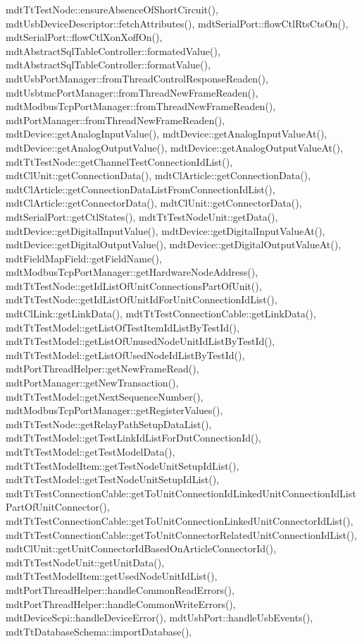mdt\-Tt\-Test\-Node\-::ensure\-Absence\-Of\-Short\-Circuit(), mdt\-Usb\-Device\-Descriptor\-::fetch\-Attributes(), mdt\-Serial\-Port\-::flow\-Ctl\-Rts\-Cts\-On(), mdt\-Serial\-Port\-::flow\-Ctl\-Xon\-Xoff\-On(), mdt\-Abstract\-Sql\-Table\-Controller\-::formated\-Value(), mdt\-Abstract\-Sql\-Table\-Controller\-::format\-Value(), mdt\-Usb\-Port\-Manager\-::from\-Thread\-Control\-Response\-Readen(), mdt\-Usbtmc\-Port\-Manager\-::from\-Thread\-New\-Frame\-Readen(), mdt\-Modbus\-Tcp\-Port\-Manager\-::from\-Thread\-New\-Frame\-Readen(), mdt\-Port\-Manager\-::from\-Thread\-New\-Frame\-Readen(), mdt\-Device\-::get\-Analog\-Input\-Value(), mdt\-Device\-::get\-Analog\-Input\-Value\-At(), mdt\-Device\-::get\-Analog\-Output\-Value(), mdt\-Device\-::get\-Analog\-Output\-Value\-At(), mdt\-Tt\-Test\-Node\-::get\-Channel\-Test\-Connection\-Id\-List(), mdt\-Cl\-Unit\-::get\-Connection\-Data(), mdt\-Cl\-Article\-::get\-Connection\-Data(), mdt\-Cl\-Article\-::get\-Connection\-Data\-List\-From\-Connection\-Id\-List(), mdt\-Cl\-Article\-::get\-Connector\-Data(), mdt\-Cl\-Unit\-::get\-Connector\-Data(), mdt\-Serial\-Port\-::get\-Ctl\-States(), mdt\-Tt\-Test\-Node\-Unit\-::get\-Data(), mdt\-Device\-::get\-Digital\-Input\-Value(), mdt\-Device\-::get\-Digital\-Input\-Value\-At(), mdt\-Device\-::get\-Digital\-Output\-Value(), mdt\-Device\-::get\-Digital\-Output\-Value\-At(), mdt\-Field\-Map\-Field\-::get\-Field\-Name(), mdt\-Modbus\-Tcp\-Port\-Manager\-::get\-Hardware\-Node\-Address(), mdt\-Tt\-Test\-Node\-::get\-Id\-List\-Of\-Unit\-Connections\-Part\-Of\-Unit(), mdt\-Tt\-Test\-Node\-::get\-Id\-List\-Of\-Unit\-Id\-For\-Unit\-Connection\-Id\-List(), mdt\-Cl\-Link\-::get\-Link\-Data(), mdt\-Tt\-Test\-Connection\-Cable\-::get\-Link\-Data(), mdt\-Tt\-Test\-Model\-::get\-List\-Of\-Test\-Item\-Id\-List\-By\-Test\-Id(), mdt\-Tt\-Test\-Model\-::get\-List\-Of\-Unused\-Node\-Unit\-Id\-List\-By\-Test\-Id(), mdt\-Tt\-Test\-Model\-::get\-List\-Of\-Used\-Node\-Id\-List\-By\-Test\-Id(), mdt\-Port\-Thread\-Helper\-::get\-New\-Frame\-Read(), mdt\-Port\-Manager\-::get\-New\-Transaction(), mdt\-Tt\-Test\-Model\-::get\-Next\-Sequence\-Number(), mdt\-Modbus\-Tcp\-Port\-Manager\-::get\-Register\-Values(), mdt\-Tt\-Test\-Node\-::get\-Relay\-Path\-Setup\-Data\-List(), mdt\-Tt\-Test\-Model\-::get\-Test\-Link\-Id\-List\-For\-Dut\-Connection\-Id(), mdt\-Tt\-Test\-Model\-::get\-Test\-Model\-Data(), mdt\-Tt\-Test\-Model\-Item\-::get\-Test\-Node\-Unit\-Setup\-Id\-List(), mdt\-Tt\-Test\-Model\-::get\-Test\-Node\-Unit\-Setup\-Id\-List(), mdt\-Tt\-Test\-Connection\-Cable\-::get\-To\-Unit\-Connection\-Id\-Linked\-Unit\-Connection\-Id\-List\-Part\-Of\-Unit\-Connector(), mdt\-Tt\-Test\-Connection\-Cable\-::get\-To\-Unit\-Connection\-Linked\-Unit\-Connector\-Id\-List(), mdt\-Tt\-Test\-Connection\-Cable\-::get\-To\-Unit\-Connector\-Related\-Unit\-Connection\-Id\-List(), mdt\-Cl\-Unit\-::get\-Unit\-Connector\-Id\-Based\-On\-Article\-Connector\-Id(), mdt\-Tt\-Test\-Node\-Unit\-::get\-Unit\-Data(), mdt\-Tt\-Test\-Model\-Item\-::get\-Used\-Node\-Unit\-Id\-List(), mdt\-Port\-Thread\-Helper\-::handle\-Common\-Read\-Errors(), mdt\-Port\-Thread\-Helper\-::handle\-Common\-Write\-Errors(), mdt\-Device\-Scpi\-::handle\-Device\-Error(), mdt\-Usb\-Port\-::handle\-Usb\-Events(), mdt\-Tt\-Database\-Schema\-::import\-Database(), 